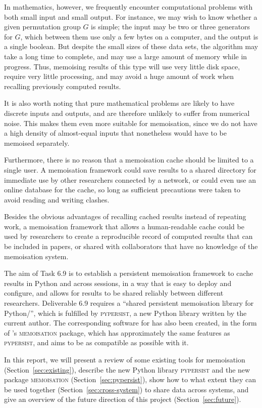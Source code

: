 \documentclass{deliverablereport}
\newcommand{\pypersist}{\textsc{pypersist}}
\newcommand{\Memoisation}{\textsc{memoisation}}
\begin{document}
In mathematics, however, we frequently encounter computational problems with
both small input and small output.  For instance, we may wish to know whether a
given permutation group $G$ is simple; the input may be two or three generators
for $G$, which between them use only a few bytes on a computer, and the output
is a single boolean.  But despite the small sizes of these data sets, the
algorithm may take a long time to complete, and may use a large amount of memory
while in progress.  Thus, memoising results of this type will use very little
disk space, require very little processing, and may avoid a huge amount of work
when recalling previously computed results.

It is also worth noting that pure mathematical problems are likely to have
discrete inputs and outputs, and are therefore unlikely to suffer from numerical
noise.  This makes them even more suitable for memoisation, since we do not have
a high density of almost-equal inputs that nonetheless would have to be memoised
separately.

Furthermore, there is no reason that a memoisation cache should be limited to a
single user.  A memoisation framework could save results to a shared directory
for immediate use by other researchers connected by a network, or could even
use an online database for the cache, so long as sufficient precautions were
taken to avoid reading and writing clashes.

Besides the obvious advantages of recalling cached results instead of repeating
work, a memoisation framework that allows a human-readable cache could be used
by researchers to create a reproducible record of computed results that can be
included in papers, or shared with collaborators that have no knowledge of the
memoisation system.

The aim of \ODK Task 6.9 is to establish a persistent memoisation framework to
cache results in Python and \GAP across sessions, in a way that is easy to deploy
and configure, and allows for results to be shared reliably between different
researchers.  Deliverable 6.9 requires a ``shared persistent memoisation library
for Python/\Sage'', which is fulfilled by \pypersist{}, a new Python library
written by the current author.  The corresponding software for \GAP has also been
created, in the form of \GAP's \Memoisation{} package, which has
approximately the same features as \pypersist{}, and aims to be as compatible as
possible with it.

In this report, we will present a review of some existing tools for memoisation
(Section~\ref{sec:existing}), describe the new Python library \pypersist{} and
the new \GAP package \Memoisation{} (Section~\ref{sec:pypersist}),
show how to what extent they can be used together
(Section~\ref{sec:cross-system}) to share data across systems, and
give an overview of the future direction of this project
(Section~\ref{sec:future}).
\end{document}
